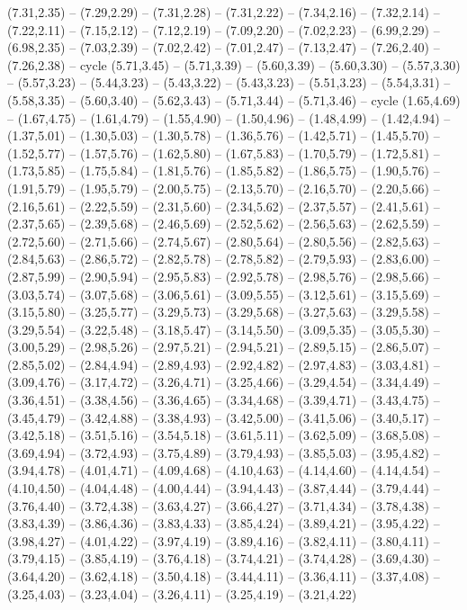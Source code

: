 \expandafter\def\csname geo:gebiet:FJI\endcsname{
  }
\expandafter\def\csname geo:gebiet:TZA\endcsname{
  (7.31,2.35) -- (7.29,2.29) -- (7.31,2.28) -- (7.31,2.22) -- (7.34,2.16) -- (7.32,2.14) -- (7.22,2.11) -- (7.15,2.12) -- (7.12,2.19) -- (7.09,2.20) -- (7.02,2.23) -- (6.99,2.29) -- (6.98,2.35) -- (7.03,2.39) -- (7.02,2.42) -- (7.01,2.47) -- (7.13,2.47) -- (7.26,2.40) -- (7.26,2.38) -- cycle}
\expandafter\def\csname geo:gebiet:SAH\endcsname{
  (5.71,3.45) -- (5.71,3.39) -- (5.60,3.39) -- (5.60,3.30) -- (5.57,3.30) -- (5.57,3.23) -- (5.44,3.23) -- (5.43,3.22) -- (5.43,3.23) -- (5.51,3.23) -- (5.54,3.31) -- (5.58,3.35) -- (5.60,3.40) -- (5.62,3.43) -- (5.71,3.44) -- (5.71,3.46) -- cycle}
\expandafter\def\csname geo:gebiet:CAN\endcsname{
  (1.65,4.69) -- (1.67,4.75) -- (1.61,4.79) -- (1.55,4.90) -- (1.50,4.96) -- (1.48,4.99) -- (1.42,4.94) -- (1.37,5.01) -- (1.30,5.03) -- (1.30,5.78) -- (1.36,5.76) -- (1.42,5.71) -- (1.45,5.70) -- (1.52,5.77) -- (1.57,5.76) -- (1.62,5.80) -- (1.67,5.83) -- (1.70,5.79) -- (1.72,5.81) -- (1.73,5.85) -- (1.75,5.84) -- (1.81,5.76) -- (1.85,5.82) -- (1.86,5.75) -- (1.90,5.76) -- (1.91,5.79) -- (1.95,5.79) -- (2.00,5.75) -- (2.13,5.70) -- (2.16,5.70) -- (2.20,5.66) -- (2.16,5.61) -- (2.22,5.59) -- (2.31,5.60) -- (2.34,5.62) -- (2.37,5.57) -- (2.41,5.61) -- (2.37,5.65) -- (2.39,5.68) -- (2.46,5.69) -- (2.52,5.62) -- (2.56,5.63) -- (2.62,5.59) -- (2.72,5.60) -- (2.71,5.66) -- (2.74,5.67) -- (2.80,5.64) -- (2.80,5.56) -- (2.82,5.63) -- (2.84,5.63) -- (2.86,5.72) -- (2.82,5.78) -- (2.78,5.82) -- (2.79,5.93) -- (2.83,6.00) -- (2.87,5.99) -- (2.90,5.94) -- (2.95,5.83) -- (2.92,5.78) -- (2.98,5.76) -- (2.98,5.66) -- (3.03,5.74) -- (3.07,5.68) -- (3.06,5.61) -- (3.09,5.55) -- (3.12,5.61) -- (3.15,5.69) -- (3.15,5.80) -- (3.25,5.77) -- (3.29,5.73) -- (3.29,5.68) -- (3.27,5.63) -- (3.29,5.58) -- (3.29,5.54) -- (3.22,5.48) -- (3.18,5.47) -- (3.14,5.50) -- (3.09,5.35) -- (3.05,5.30) -- (3.00,5.29) -- (2.98,5.26) -- (2.97,5.21) -- (2.94,5.21) -- (2.89,5.15) -- (2.86,5.07) -- (2.85,5.02) -- (2.84,4.94) -- (2.89,4.93) -- (2.92,4.82) -- (2.97,4.83) -- (3.03,4.81) -- (3.09,4.76) -- (3.17,4.72) -- (3.26,4.71) -- (3.25,4.66) -- (3.29,4.54) -- (3.34,4.49) -- (3.36,4.51) -- (3.38,4.56) -- (3.36,4.65) -- (3.34,4.68) -- (3.39,4.71) -- (3.43,4.75) -- (3.45,4.79) -- (3.42,4.88) -- (3.38,4.93) -- (3.42,5.00) -- (3.41,5.06) -- (3.40,5.17) -- (3.42,5.18) -- (3.51,5.16) -- (3.54,5.18) -- (3.61,5.11) -- (3.62,5.09) -- (3.68,5.08) -- (3.69,4.94) -- (3.72,4.93) -- (3.75,4.89) -- (3.79,4.93) -- (3.85,5.03) -- (3.95,4.82) -- (3.94,4.78) -- (4.01,4.71) -- (4.09,4.68) -- (4.10,4.63) -- (4.14,4.60) -- (4.14,4.54) -- (4.10,4.50) -- (4.04,4.48) -- (4.00,4.44) -- (3.94,4.43) -- (3.87,4.44) -- (3.79,4.44) -- (3.76,4.40) -- (3.72,4.38) -- (3.63,4.27) -- (3.66,4.27) -- (3.71,4.34) -- (3.78,4.38) -- (3.83,4.39) -- (3.86,4.36) -- (3.83,4.33) -- (3.85,4.24) -- (3.89,4.21) -- (3.95,4.22) -- (3.98,4.27) -- (4.01,4.22) -- (3.97,4.19) -- (3.89,4.16) -- (3.82,4.11) -- (3.80,4.11) -- (3.79,4.15) -- (3.85,4.19) -- (3.76,4.18) -- (3.74,4.21) -- (3.74,4.28) -- (3.69,4.30) -- (3.64,4.20) -- (3.62,4.18) -- (3.50,4.18) -- (3.44,4.11) -- (3.36,4.11) -- (3.37,4.08) -- (3.25,4.03) -- (3.23,4.04) -- (3.26,4.11) -- (3.25,4.19) -- (3.21,4.22) }
